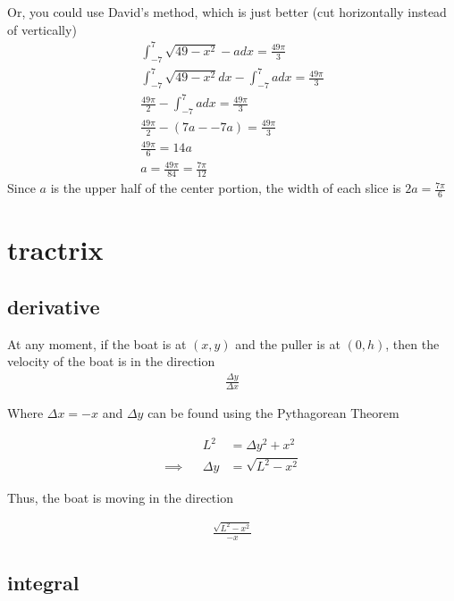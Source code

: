 \documentclass[letterpaper]{article}
\begin{document}
Or, you could use David's method, which is just better (cut horizontally instead of vertically)
\[\begin{aligned}
  \int_{-7}^{7} \sqrt{49-x^2} - a dx = \frac{49\pi }{3}\\
  \int_{-7}^{7} \sqrt{49-x^2} dx -\int_{-7}^{7}  a dx = \frac{49\pi }{3}\\
  \frac{49\pi }{2} -\int_{-7}^{7}  a dx = \frac{49\pi }{3}\\
  \frac{49\pi }{2} -\left( 7a - -7a \right)  = \frac{49\pi }{3}\\
  \frac{49\pi }{6} = 14a\\
  a = \frac{49\pi }{84} = \frac{7\pi }{12}
  \end{aligned}\]
Since \(a\) is the upper half of the center portion, the width of each slice is \(2a = \frac{7 \pi}{6}\)

\section{tractrix}
\label{sec:org9d2c6be}

\subsection{derivative}
\label{sec:org7031b3d}

At any moment, if the boat is at \((x, y)\) and the puller is at \((0, h)\), then the velocity of the boat is in the direction
\[\begin{aligned}
  \frac{\Delta y}{\Delta x}
  \end{aligned}\]

Where \(\Delta x = -x\) and \(\Delta y\) can be found using the Pythagorean Theorem

\[\begin{aligned}
  &&L ^2 &= \Delta y ^2 + x ^2\\
  \implies && \Delta y &= \sqrt{L^2 - x ^2}
  \end{aligned}\]

Thus, the boat is moving in the direction

\[\begin{aligned}
  \frac{\sqrt{L^2-x^2}}{ -x}
  \end{aligned}\]

\subsection{integral}
\label{sec:orge44f031}
\end{document}
